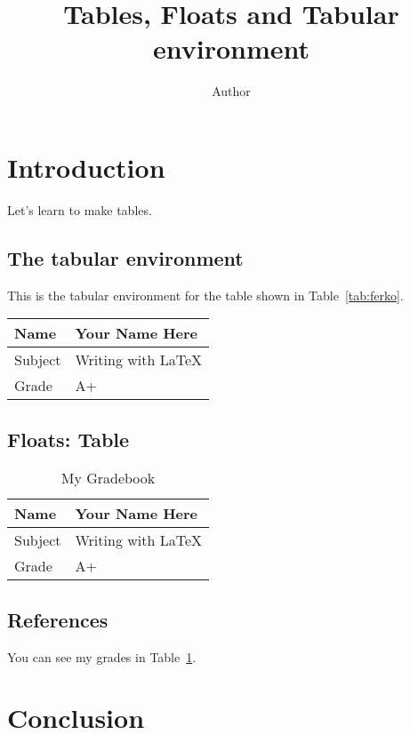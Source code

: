 \documentclass{article}
\title{Tables, Floats and Tabular environment}
\author{Author}
\date{}
\begin{document}
    \maketitle

    \section{Introduction}
    Let's learn to make tables.
    
    \subsection{The tabular environment}

    This is the tabular environment for the table shown in Table~\ref{tab:ferko}.
    \bigskip %

    \begin{tabular}{|l|l|}
        \hline
        Name & Your Name Here \\
        \hline
        Subject & Writing with \LaTeX \\
        \hline
        Grade & A+ \\
        \hline
    \end{tabular}

    \subsection{Floats: Table}

    \begin{table}[htpb]
        \caption{My Gradebook}
        \begin{center}
            \begin{tabular}{|l|l|}
                \hline
                Name & Your Name Here \\
                \hline
                Subject & Writing with \LaTeX \\
                \hline
                Grade & A+ \\
                \hline
            \end{tabular}
        \end{center}
        \label{tab:grades}
    \end{table}

    \subsection{References}

    You can see my grades in Table~\ref{tab:grades}.
    
    \section{Conclusion}
\end{document}
